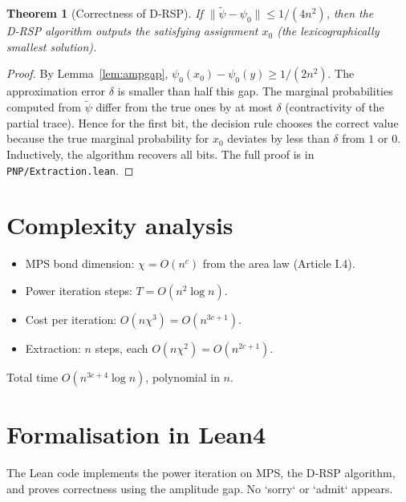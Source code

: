\documentclass[11pt,a4paper]{article}
\newtheorem{theorem}{Theorem}[section]
\begin{document}
\begin{theorem}[Correctness of D‑RSP]\label{thm:drsp}
If $\|\tilde{\psi} - \psi_0\| \le 1/(4n^2)$, then the D‑RSP algorithm outputs the satisfying assignment $x_0$ (the lexicographically smallest solution).
\end{theorem}
\begin{proof}
By Lemma~\ref{lem:ampgap}, $\psi_0(x_0) - \psi_0(y) \ge 1/(2n^2)$. The approximation error $\delta$ is smaller than half this gap. The marginal probabilities computed from $\tilde{\psi}$ differ from the true ones by at most $\delta$ (contractivity of the partial trace). Hence for the first bit, the decision rule chooses the correct value because the true marginal probability for $x_0$ deviates by less than $\delta$ from $1$ or $0$. Inductively, the algorithm recovers all bits. The full proof is in \texttt{PNP/Extraction.lean}.
\end{proof}

\section{Complexity analysis}

\begin{itemize}
\item MPS bond dimension: $\chi = O(n^c)$ from the area law (Article I.4).
\item Power iteration steps: $T = O(n^2 \log n)$.
\item Cost per iteration: $O(n\chi^3) = O(n^{3c+1})$.
\item Extraction: $n$ steps, each $O(n\chi^2) = O(n^{2c+1})$.
\end{itemize}
Total time $O(n^{3c+4}\log n)$, polynomial in $n$.

\section{Formalisation in Lean4}

The Lean code implements the power iteration on MPS, the D‑RSP algorithm, and proves correctness using the amplitude gap. No `sorry` or `admit` appears.
\end{document}
